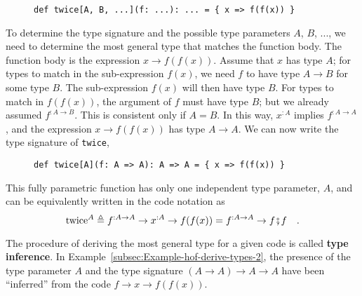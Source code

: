 \begin{wrapfigure}{l}{0.525\columnwidth}%
\vspace{-0.75\baselineskip}
\begin{lstlisting}
def twice[A, B, ...](f: ...): ... = { x => f(f(x)) }
\end{lstlisting}
\vspace{-1\baselineskip}
\end{wrapfigure}%

\noindent To determine the type signature and the possible type parameters
$A$, $B$, ..., we need to determine the most general type that matches
the function body. The function body is the expression $x\rightarrow f(f(x))$.
Assume that $x$ has type $A$; for types to match in the sub-expression
$f(x)$, we need $f$ to have type $A\rightarrow B$ for some type
$B$. The sub-expression $f(x)$ will then have type $B$. For types
to match in $f(f(x))$, the argument of $f$ must have type $B$;
but we already assumed $f^{:A\rightarrow B}$. This is consistent
only if $A=B$. In this way, $x^{:A}$ implies $f^{:A\rightarrow A}$,
and the expression $x\rightarrow f(f(x))$ has type $A\rightarrow A$.
We can now write the type signature of \lstinline!twice!,

\begin{wrapfigure}{l}{0.51\columnwidth}%
\vspace{-0.75\baselineskip}
\begin{lstlisting}
def twice[A](f: A => A): A => A = { x => f(f(x)) }
\end{lstlisting}
\vspace{-0.95\baselineskip}
\end{wrapfigure}%

\noindent This fully parametric function has only one independent
type parameter, $A$, and can be equivalently written in the code
notation as 
\begin{equation}
\text{twice}^{A}\triangleq f^{:A\rightarrow A}\rightarrow x^{:A}\rightarrow f(f(x))=f^{:A\rightarrow A}\rightarrow f\bef f\quad.\label{eq:hof-def-of-twice-in-math-notation}
\end{equation}

The procedure of deriving the most general type for a given code is
called \textbf{type inference}. In Example~\ref{subsec:Example-hof-derive-types-2},
the presence of the type parameter $A$ and the type signature $\left(A\rightarrow A\right)\rightarrow A\rightarrow A$
have been \textsf{``}inferred\textsf{''} from the code $f\rightarrow x\rightarrow f(f(x))$.

